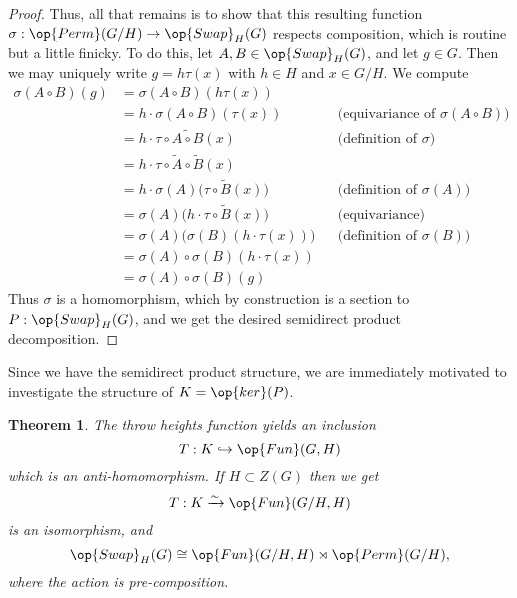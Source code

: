 \documentclass[12nt]{article}
\theoremstyle{plain}
\newtheorem{theorem}{Theorem}
\begin{document}
\begin{proof}
Thus, all that remains is to show that this resulting function $\sigma : \op{Perm}(G/H) \to \op{Swap}_H(G)$ respects composition, which is routine but a little finicky. To do this, let $A, B \in \op{Swap}_H(G)$, and let $g \in G$. Then we may uniquely write $g = h\tau(x)$ with $h \in H$ and $x \in G/H$. We compute
\begin{align*}
\sigma(A \circ B)(g) &= \sigma(A \circ B)(h\tau(x)) \\
	&= h \cdot \sigma(A \circ B)(\tau(x)) && \text{(equivariance of $\sigma(A \circ B)$)}\\
	&= h \cdot \tau \circ \widetilde{A \circ B}(x) && \text{(definition of $\sigma$)} \\
	&= h \cdot \tau \circ \widetilde{A} \circ \widetilde{B}(x) \\
	&= h \cdot \sigma(A)\Big(\tau \circ \widetilde{B}(x)\Big) && \text{(definition of $\sigma(A)$)}\\
	&= \sigma(A)\Big( h \cdot \tau \circ \widetilde{B}(x)\Big) && \text{(equivariance)} \\
	&= \sigma(A)\Big(\sigma(B)(h \cdot \tau(x))\Big) && \text{(definition of $\sigma(B)$)} \\
	&= \sigma(A) \circ \sigma(B)(h \cdot \tau(x)) \\
	&= \sigma(A) \circ \sigma(B)(g)
\end{align*} 
Thus $\sigma$ is a homomorphism, which by construction is a section to $P : \op{Swap}_H(G)$, and we get the desired semidirect product decomposition.

\end{proof}

Since we have the semidirect product structure, we are immediately motivated to investigate the structure of $K = \op{ker}(P)$.

\begin{theorem}
The throw heights function yields an inclusion
\[
T : K \hookrightarrow \op{Fun}(G, H)
\]
which is an anti-homomorphism. If $H \subset Z(G)$ then we get 
\[
T : K \xrightarrow{\sim} \op{Fun}(G/H, H)
\]
is an isomorphism, and
\[
\op{Swap}_H(G) \cong \op{Fun}(G/H, H) \rtimes \op{Perm}(G/H),
\]
where the action is pre-composition.
\end{theorem}
\end{document}
